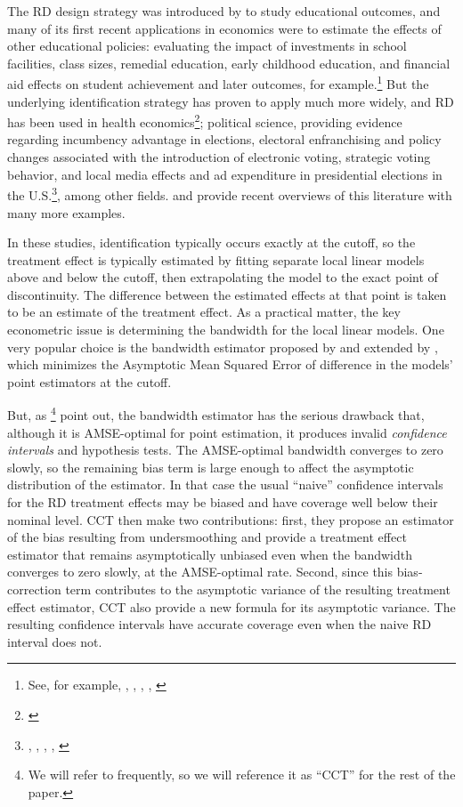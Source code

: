 \documentclass[12pt,fleqn]{article}
\begin{document}
The RD design strategy was introduced by \cite{thistlethwaite1960} to study
educational outcomes, and many of its first recent applications in economics
were to estimate the effects of other educational policies: evaluating the
impact of investments in school facilities, class sizes, remedial education,
early childhood education, and financial aid effects on student achievement and
later outcomes, for example.\footnote{%
  See, for example, \cite{vdk2002}, \cite{jacoblefgren2004}, \cite{ludwig2007},
  \cite{urquiola2009}, \cite{cellini2010}} %
But the underlying identification strategy has proven to apply much more widely,
and RD has been used in health economics\footnote{%
  \cite{Card2009,barreca2011saving}}; %
political science, providing evidence regarding incumbency advantage in
elections, electoral enfranchising and policy changes associated with the
introduction of electronic voting, strategic voting behavior, and local media
effects and ad expenditure in presidential elections in the U.S.\footnote{%
  \cite{lee2008}, \cite{Caughey2011}, \cite{keele2014geographic},
  \cite{erikson2015}, \cite{Fujiwara2011,Fujiwara2015}}, %
among other fields. \cite{imbens2008} and \cite{lee2010} provide recent
overviews of this literature with many more examples.

In these studies, identification typically occurs exactly at the cutoff, so the
treatment effect is typically estimated by fitting separate local linear models
above and below the cutoff, then extrapolating the model to the exact point of
discontinuity. The difference between the estimated effects at that point is
taken to be an estimate of the treatment effect. As a practical matter, the key
econometric issue is determining the bandwidth for the local linear models.  One
very popular choice is the bandwidth estimator proposed by \cite{IK} and
extended by \cite{calonico2014}, which minimizes the Asymptotic Mean Squared
Error of difference in the models' point estimators at the cutoff.

But, as \cite{calonico2014}\footnote{%
  We will refer to \cite{calonico2014} frequently, so we will reference it as
  ``CCT'' for the rest of the paper.} %
point out, the \cite{IK} bandwidth estimator has the serious drawback that,
although it is AMSE-optimal for point estimation, it produces invalid
\emph{confidence intervals} and hypothesis tests. The AMSE-optimal bandwidth
converges to zero slowly, so the remaining bias term is large enough to affect
the asymptotic distribution of the estimator. In that case the usual ``naive''
confidence intervals for the RD treatment effects may be biased and have
coverage well below their nominal level. CCT then make two contributions: first,
they propose an estimator of the bias resulting from undersmoothing and provide
a treatment effect estimator that remains asymptotically unbiased even when the
bandwidth converges to zero slowly, at the AMSE-optimal rate.  Second, since
this bias-correction term contributes to the asymptotic variance of the
resulting treatment effect estimator, CCT also provide a new formula for its
asymptotic variance. The resulting confidence intervals have accurate coverage
even when the naive RD interval does not.
\end{document}
